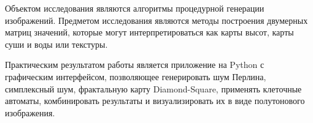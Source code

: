 Объектом исследования являются алгоритмы процедурной генерации изображений. Предметом исследования являются методы построения двумерных матриц значений, которые могут интерпретироваться как карты высот, карты суши и воды или текстуры.

Практическим результатом работы является приложение на Python с графическим интерфейсом, позволяющее генерировать шум Перлина, симплексный шум, фрактальную карту Diamond-Square, применять клеточные автоматы, комбинировать результаты и визуализировать их в виде полутонового изображения.
